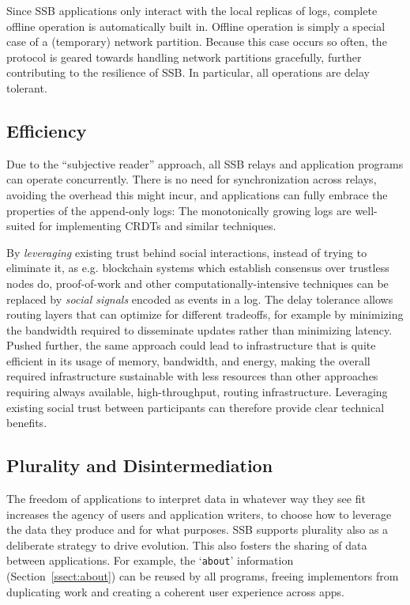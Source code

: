 \documentclass[9pt,sigconf]{acmart}
\begin{document}
Since SSB applications only interact with the local replicas of logs,
complete offline operation is automatically built in. Offline
operation is simply a special case of a (temporary) network
partition. Because this case occurs so often, the protocol is geared
towards handling network partitions gracefully, further contributing
to the resilience of SSB. In particular, all operations are delay
tolerant.

\subsection{Efficiency}

Due to the ``subjective reader'' approach, all SSB relays and
application programs can operate concurrently. There is no need for
synchronization across relays, avoiding the overhead this might incur,
and applications can fully embrace the properties of the append-only
logs: The monotonically growing logs are well-suited for implementing
CRDTs and similar techniques.

By {\em leveraging} existing trust behind social interactions, instead
of trying to eliminate it, as e.g. blockchain systems which establish
consensus over trustless nodes do, proof-of-work and other
computationally-intensive techniques can be replaced by \textit{social
  signals} encoded as events in a log. The delay tolerance allows
routing layers that can optimize for different tradeoffs, for example
by minimizing the bandwidth required to disseminate updates rather
than minimizing latency. Pushed further, the same approach could lead
to infrastructure that is quite efficient in its usage of memory,
bandwidth, and energy, making the overall required infrastructure
sustainable with less resources than other approaches requiring always
available, high-throughput, routing infrastructure. Leveraging
existing social trust between participants can therefore provide clear
technical benefits.

\subsection{Plurality and Disintermediation}

The freedom of applications to interpret data in whatever way they see
fit increases the agency of users and application writers, to choose
how to leverage the data they produce and for what purposes. SSB
supports plurality also as a deliberate strategy to drive
evolution. This also fosters the sharing of data between
applications. For example, the `{\small\tt about}' information
(Section~\ref{ssect:about}) can be reused by all programs, freeing
implementors from duplicating work and creating a coherent user
experience across apps.
\end{document}

